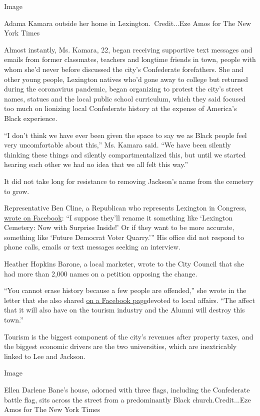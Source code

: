Image

Adama Kamara outside her home in Lexington.~Credit...Eze Amos for The
New York Times

Almost instantly, Ms. Kamara, 22, began receiving supportive text
messages and emails from former classmates, teachers and longtime
friends in town, people with whom she'd never before discussed the
city's Confederate forefathers. She and other young people, Lexington
natives who'd gone away to college but returned during the coronavirus
pandemic, began organizing to protest the city's street names, statues
and the local public school curriculum, which they said focused too much
on lionizing local Confederate history at the expense of America's Black
experience.

``I don't think we have ever been given the space to say we as Black
people feel very uncomfortable about this,'' Ms. Kamara said. ``We have
been silently thinking these things and silently compartmentalized this,
but until we started hearing each other we had no idea that we all felt
this way.''

It did not take long for resistance to removing Jackson's name from the
cemetery to grow.

Representative Ben Cline, a Republican who represents Lexington in
Congress,
\href{https://www.facebook.com/48631937877/posts/10158889404357878/?d=n}{wrote
on Facebook}: ``I suppose they'll rename it something like `Lexington
Cemetery: Now with Surprise Inside!' Or if they want to be more
accurate, something like `Future Democrat Voter Quarry.''' His office
did not respond to phone calls, emails or text messages seeking an
interview.

Heather Hopkins Barone, a local marketer, wrote to the City Council that
she had more than 2,000 names on a petition opposing the change.

``You cannot erase history because a few people are offended,'' she
wrote in the letter that she also shared
\href{https://www.facebook.com/historicdowntownlexingtonvirginia/posts/1897047810425491}{on
a Facebook page}devoted to local affairs. ``The affect that it will also
have on the tourism industry and the Alumni will destroy this town.''

Tourism is the biggest component of the city's revenues after property
taxes, and the biggest economic drivers are the two universities, which
are inextricably linked to Lee and Jackson.

Image

Ellen Darlene Bane's house, adorned with three flags, including the
Confederate battle flag, sits across the street from a predominantly
Black church.Credit...Eze Amos for The New York Times


